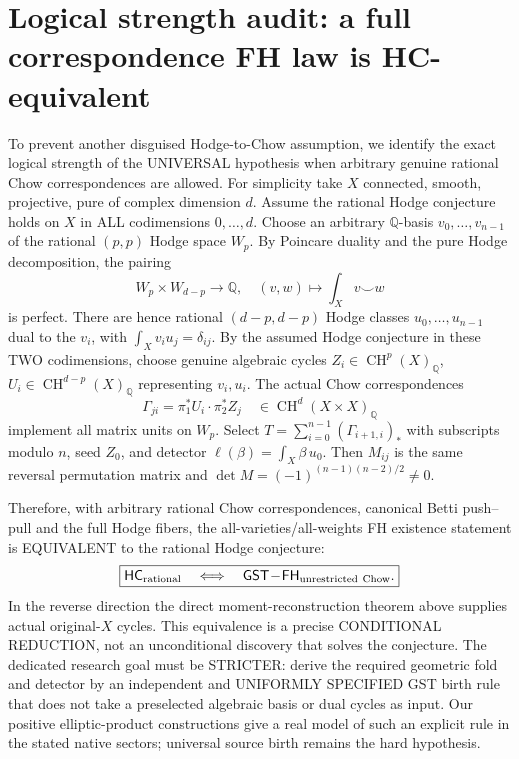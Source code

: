 \documentclass[11pt]{article}
\newcommand{\Q}{\mathbb Q}
\newcommand{\CH}{\operatorname{CH}}
\begin{document}
\section{Logical strength audit: a full correspondence FH law is HC-equivalent}
To prevent another disguised Hodge-to-Chow assumption, we identify
the exact logical strength of the UNIVERSAL hypothesis when
arbitrary genuine rational Chow correspondences are allowed.
For simplicity take $X$ connected, smooth, projective,
pure of complex dimension $d$. Assume the rational Hodge conjecture
holds on $X$ in ALL codimensions $0,\dots,d$.
Choose an arbitrary $\Q$-basis $v_0,\dots,v_{n-1}$ of the
rational $(p,p)$ Hodge space $W_p$.
By Poincare duality and the pure Hodge decomposition, the pairing
\[
W_p\times W_{d-p}\longrightarrow\Q,\quad
(v,w)\longmapsto\int_X v\smile w
\]
is perfect. There are hence rational $(d-p,d-p)$ Hodge
classes $u_0,\dots,u_{n-1}$ dual to the $v_i$,
with $\int_X v_i u_j=\delta_{ij}$.
By the assumed Hodge conjecture in these TWO codimensions,
choose genuine algebraic cycles $Z_i\in\CH^p(X)_\Q$,
$U_i\in\CH^{d-p}(X)_\Q$ representing $v_i,u_i$.
The actual Chow correspondences
\[
\Gamma_{ji}=\pi_1^*U_i\cdot\pi_2^*Z_j
\quad\in\CH^d(X\times X)_\Q
\]
implement all matrix units on $W_p$.
Select $T=\sum_{i=0}^{n-1}(\Gamma_{i+1,i})_*$
with subscripts modulo $n$, seed $Z_0$, and
detector $\ell(\beta)=\int_X\beta\,u_0$.
Then $M_{ij}$ is the same reversal permutation matrix and
$\det M=(-1)^{(n-1)(n-2)/2}\ne0$.

Therefore, with arbitrary rational Chow correspondences,
canonical Betti push--pull and the full Hodge fibers,
the all-varieties/all-weights FH existence statement is
EQUIVALENT to the rational Hodge conjecture:
\[
\boxed{\mathsf{HC}_{\rm rational}\quad\Longleftrightarrow\quad
\mathsf{GST\!-\!FH}_{\rm unrestricted\ Chow}.}
\]
In the reverse direction the direct moment-reconstruction theorem
above supplies actual original-$X$ cycles.
This equivalence is a precise CONDITIONAL REDUCTION,
not an unconditional discovery that solves the conjecture.
The dedicated research goal must be STRICTER:
derive the required geometric fold and detector by an independent
and UNIFORMLY SPECIFIED GST birth rule that does not take
a preselected algebraic basis or dual cycles as input.
Our positive elliptic-product constructions give a real model of
such an explicit rule in the stated native sectors; universal
source birth remains the hard hypothesis.
\end{document}

